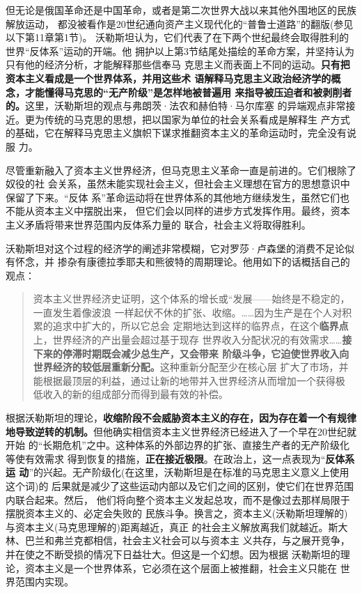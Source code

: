 但无论是俄国革命还是中国革命，或者是第二次世界大战以来其他外围地区的民族解放运动，
都没被看作是20世纪通向资产主义现代化的“普鲁士道路”的翻版(参见以下第11章第1节)。
沃勒斯坦认为，它们代表了在下两个世纪最终会取得胜利的世界“反体系”运动的开端。他
拥护以上第3节结尾处描绘的革命方案，并坚持认为只有他的经济分析，才能解释那些信奉马
克思主义而表面上不同的运动。\textbf{只有把资本主义看成是一个世界体系，并用这些术
  语解释马克思主义政治经济学的概念，才能懂得马克思的“无产阶级”是怎样地被普遍用
  来指导被压迫者和被剥削者的。}这里，沃勒斯坦的观点与弗朗茨·法农和赫伯特·马尔库塞
的异端观点非常接近。更为传统的马克思的思想，把以国家为单位的社会关系看成是解释生
产方式的基础，它在解释马克思主义旗帜下谋求推翻资本主义的革命运动时，完全没有说服
力。

尽管重新融入了资本主义世界经济，但马克思主义革命一直是前进的。它们根除了奴役的社
会关系，虽然未能实现社会主义，但社会主义理想在官方的思想意识中保留了下来。“反体
系”革命运动将在世界体系的其他地方继续发生，虽然它们也不能从资本主义中摆脱出来，
但它们会以同样的进步方式发挥作用。最终，资本主义矛盾将带来世界范围内反体系力量的
联合，社会主义将取得胜利。

沃勒斯坦对这个过程的经济学的阐述非常模糊，它对罗莎·卢森堡的消费不足论似有怀念，并
掺杂有康德拉季耶夫和熊彼特的周期理论。他用如下的话概括自己的观点：

\begin{quotation}
  资本主义世界经济史证明，这个体系的增长或“发展——始终是不稳定的，一直发生着像波浪
  一样起伏不休的扩张、收缩。……因为生产是在个人对积累的追求中扩大的，所以它总会
  定期地达到这样的临界点，在这个\textbf{临界点}上，世界经济的产出量会超过基于现存
  世界收入分配状况的有效需求……\textbf{接下来的停滞时期既会减少总生产，又会带来
    阶级斗争，它迫使世界收入向世界经济的较低层重新分配。}这种重新分配至少在核心层
  扩大了市场，并能根据最顶层的利益，通过让新的地带并入世界经济从而增加一个获得极
  低收入的新的组成部分而得到最有效的补偿。
\end{quotation}

根据沃勒斯坦的理论，\textbf{收缩阶段不会威胁资本主义的存在，因为存在着一个有规律
  地导致逆转的机制。}但他确实相信资本主义世界经济已经进入了一个早在20世纪就开始
的“长期危机”之中。这种体系的外部边界的扩张、直接生产者的无产阶级化等使有效需求
得到恢复的措施，\textbf{正在接近极限}。在政治上，这一点表现为“\textbf{反体系运
  动}”的兴起。无产阶级化(在这里，沃勒斯坦是在标准的马克思主义意义上使用这个词)的
后果就是减少了这些运动内部以及它们之间的区别，使它们在世界范围内联合起来。然后，
他们将向整个资本主义发起总攻，而不是像过去那样局限于摆脱资本主义的、必定会失败的
民族斗争。换言之，资本主义(沃勒斯坦理解的)与资本主义(马克思理解的)距离越近，真正
的社会主义解放离我们就越近。斯大林、巴兰和弗兰克都相信，社会主义社会可以与资本主
义共存，与之展开竞争，并在使之不断受损的情况下日益壮大。但这是一个幻想。因为根据
沃勒斯坦的理论，资本主义是一个世界体系，它必须在这个层面上被推翻，社会主义只能在
世界范围内实现。



